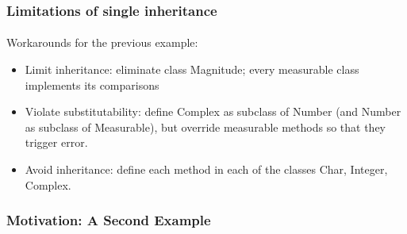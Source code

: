 \documentclass{beamer}
\begin{document}
\begin{frame}[fragile]
\frametitle{Limitations of single inheritance}
\framesubtitle{}
Workarounds for the previous example:

\begin{itemize}
\item Limit inheritance: eliminate class Magnitude; every measurable
class implements its comparisons
\item Violate substitutability: define Complex as subclass of Number
(and Number as subclass of Measurable), but override measurable
methods so that they trigger error.
\item Avoid inheritance: define each method in each of the classes
Char, Integer, Complex.
\end{itemize}
\end{frame}

\begin{frame}[fragile]
\frametitle{Motivation: A Second Example}
\framesubtitle{}
\begin{overlayarea}{\textwidth}{\textheight}\centering
{}
\end{overlayarea}
\vfill
\end{frame}
\end{document}
